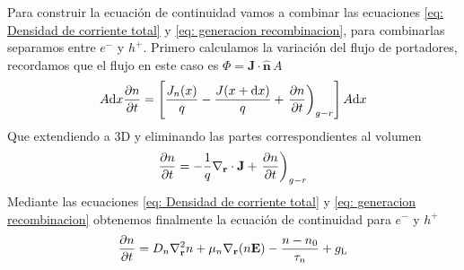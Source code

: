 Para construir la ecuación de continuidad vamos a combinar las ecuaciones \ref{eq: Densidad de corriente total} y \ref{eq: generacion recombinacion}, para combinarlas separamos entre $e^-$ y $h^+$. Primero calculamos la variación del flujo de portadores, recordamos que el flujo en este caso es $\Phi=\mathbf{J}\cdot \mathbf{\hat{n}}\,A$
\begin{equation}
    A\mathrm{d}x \pdiff[]{n}{t}=\left [\frac{J_n(x)}{q}-\frac{J(x+\mathrm{d}x)}{q}+ \left. \pdiff[]{n}{t} \right )_{g-r} \right ] A \mathrm{d}x
\end{equation}
Que extendiendo a 3D y eliminando las partes correspondientes al volumen
\begin{equation}
    \pdiff[]{n}{t}=-\frac{1}{q} \nabla_{\mathbf{r}}\cdot \mathbf{J} + \left. \pdiff[]{n}{t} \right )_{g-r}
\end{equation}
Mediante las ecuaciones \ref{eq: Densidad de corriente total} y \ref{eq: generacion recombinacion} obtenemos finalmente la ecuación de continuidad para $e^-$ y $h^+$
\begin{equation}
\pdiff[]{n}{t}=D_n \nabla_\mathbf{r}^2 n+ \mu_n \nabla_\mathbf{r} (n\mathbf{E})-\frac{n-n_0}{\tau_n}+g_\mathrm{L}
\label{eq: continuidad electrones}
\end{equation}

